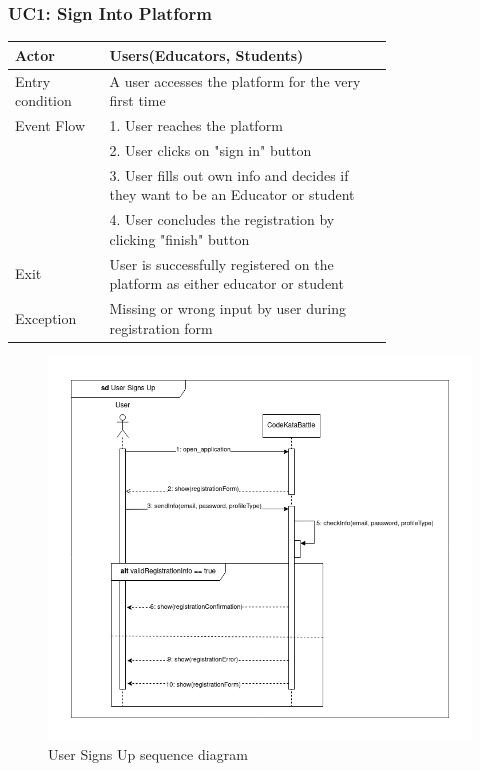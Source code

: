 \subsubsection{UC1: Sign Into Platform}
\begin{center}
    \begin{longtable}{lp{0.75\linewidth}}
        \hline
            Actor & Users(Educators, Students)\\
        \hline
            Entry condition & A user accesses the platform for the very first time\\
        \hline
            Event Flow & 1. User reaches the platform\\
                &2. User clicks on "sign in" button\\
                &3. User fills out own info and decides if they want to be an Educator or student\\
                &4. User concludes the registration by clicking "finish" button\\
        \hline
            Exit & User is successfully registered on the platform as either educator or student\\
        \hline
            Exception & Missing or wrong input by user during registration form\\
        \hline
    \end{longtable}
\end{center}


\begin{figure}[H]
    \centering
    \includegraphics[width=1\linewidth]{misc//Images//UC Diagrams/UC1.png}
    \caption{User Signs Up sequence diagram}
    \label{fig:enter-label}
\end{figure}

